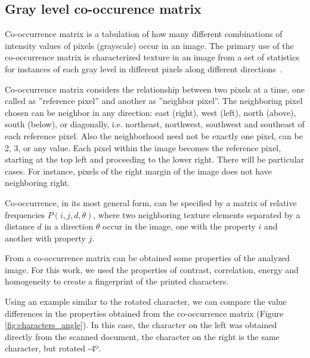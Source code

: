 \documentclass[10pt,twocolumn,letterpaper]{article}
\begin{document}
\subsection{Gray level co-occurence matrix}
\label{subsec:co-occurence_matrix}

Co-occurrence matrix is a tabulation of how many different combinations of intensity values of pixels (grayscale) occur in an image. The primary use of the co-occurrence matrix is characterized texture in an image from a set of statistics for instances of
each gray level in different pixels along different directions~\cite{Rocha}.

Co-occurrence matrix considers the relationship between two pixels at a time, one called as ''reference pixel'' and another as ''neighbor pixel''. The neighboring pixel chosen can be neighbor in any direction: east (right), west (left), north (above), south (below), or diagonally, i.e. northeast, northwest, southwest and southeast of each reference pixel. Also the neighborhood need not be exactly one pixel, can be 2, 3, or any value. Each pixel within the image becomes the reference pixel, starting at the top left and proceeding to the lower right. There will be particular cases. For instance, pixels of the right margin of the image does not have neighboring right.

Co-occurrence, in its most general form, can be specified by a matrix of relative frequencies $P (i, j, d,\theta)$, where two neighboring texture elements separated by a distance $d$ in a direction $\theta$ occur in the image, one with the property $i$ and another with property $j$.

From a co-occurrence matrix can be obtained some properties of the analyzed image. For this work, we used the properties of contrast, correlation, energy and homogeneity to create a fingerprint of the printed characters.

Using an example similar to the rotated character, we can compare the value differences in the properties obtained from the co-occurrence matrix (Figure \ref{fig:characters_angle}). In this case, the character on the left was obtained directly from the scanned document, the character on the right is the same character, but rotated -4º.
\end{document}
